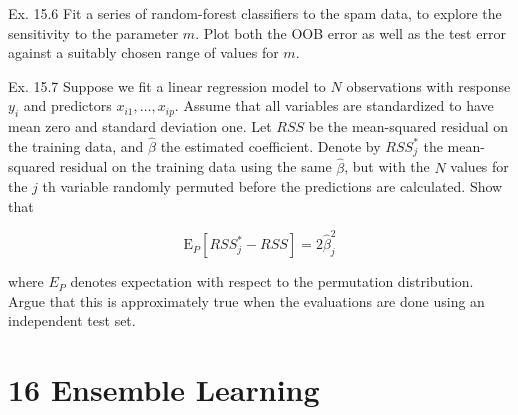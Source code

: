 \documentclass[10pt]{article}
\begin{document}
Ex. 15.6 Fit a series of random-forest classifiers to the spam data, to explore the sensitivity to the parameter $m$. Plot both the OOB error as well as the test error against a suitably chosen range of values for $m$.

Ex. 15.7 Suppose we fit a linear regression model to $N$ observations with response $y_{i}$ and predictors $x_{i 1}, \ldots, x_{i p}$. Assume that all variables are standardized to have mean zero and standard deviation one. Let $R S S$ be the mean-squared residual on the training data, and $\hat{\beta}$ the estimated coefficient. Denote by $R S S_{j}^{*}$ the mean-squared residual on the training data using the same $\hat{\beta}$, but with the $N$ values for the $j$ th variable randomly permuted before the predictions are calculated. Show that


\begin{equation*}
\mathrm{E}_{P}\left[R S S_{j}^{*}-R S S\right]=2 \hat{\beta}_{j}^{2} \tag{15.13}
\end{equation*}


where $E_{P}$ denotes expectation with respect to the permutation distribution. Argue that this is approximately true when the evaluations are done using an independent test set.

\section*{16 Ensemble Learning}
\end{document}
